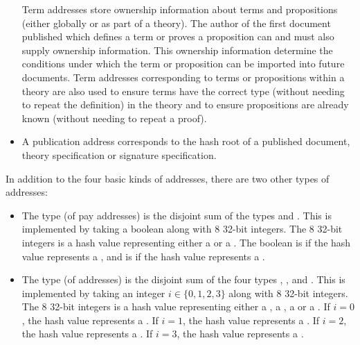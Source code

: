 \begin{itemize}
\begin{enumerate}
\end{enumerate}
Term addresses store ownership information about terms and propositions (either globally or as part of a theory).
The author of the first document published which defines a term or proves a proposition can and must
also supply ownership information. This ownership information determine the conditions under
which the term or proposition can be imported into future documents.
Term addresses corresponding to terms or propositions within a theory are also used
to ensure terms have the correct type (without needing to repeat the definition) in the theory
and to ensure propositions are already known (without needing to repeat a proof).
\item {}
A publication address corresponds to the hash root of a published document, theory specification or signature specification.
\end{itemize}

In addition to the four basic kinds of addresses, there are two other types of addresses:
\begin{itemize}
\item {}
The type {} (of pay addresses) is the disjoint sum of the types {} and {}.
This is implemented by taking a boolean along with 8 32-bit integers.
The 8 32-bit integers is a hash value representing either a {}
or a {}.
The boolean is {} if the hash value represents a {},
and is {} if the hash value represents a {}.
\item {}
The type {} (of addresses) is the disjoint sum of the four types
{}, {},
{} and {}.
This is implemented by taking an integer $i\in\{0,1,2,3\}$ along with 8 32-bit integers.
The 8 32-bit integers is a hash value representing either a {}, a {},
a {} or a {}.
If $i=0$, the hash value represents a {}.
If $i=1$, the hash value represents a {}.
If $i=2$, the hash value represents a {}.
If $i=3$, the hash value represents a {}.
\end{itemize}

